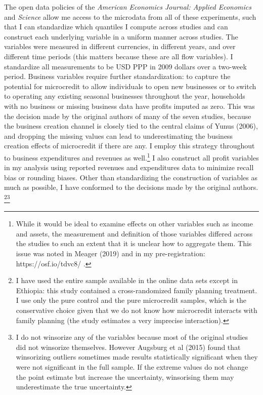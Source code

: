\documentclass[AER]{AEA}
\begin{document}

The open data policies of the \emph{American Economics Journal: Applied Economics} and \emph{Science} allow me access to the microdata from all of these experiments, such that I can standardize which quantiles I compute across studies and can construct each underlying variable in a uniform manner across studies. The variables were measured in different currencies, in different years, and over different time periods (this matters because these are all flow variables). I standardize all measurements to be USD PPP in 2009 dollars over a two-week period. Business variables require further standardization: to capture the potential for microcredit to allow individuals to open new businesses or to switch to operating any existing seasonal businesses throughout the year, households with no business or missing business data have profits imputed as zero. This was the decision made by the original authors of many of the seven studies, because the business creation channel is closely tied to the central claims of Yunus (2006), and dropping the missing values can lead to underestimating the business creation effects of microcredit if there are any. I employ this strategy throughout to business expenditures and revenues as well.\footnote{While it would be ideal to examine effects on other variables such as income and assets, the measurement and definition of those variables differed across the studies to such an extent that it is unclear how to aggregate them. This issue was noted in Meager (2019) and in my pre-registration: https://osf.io/tdvc8/ .} I also construct all profit variables in my analysis using reported revenues and expenditures data to minimize recall bias or rounding biases. Other than standardizing the construction of variables as much as possible, I have conformed to the decisions made by the original authors. \footnote{I have used the entire sample available in the online data sets except in Ethiopia: this study contained a cross-randomized family planning treatment. I use only the pure control and the pure microcredit samples, which is the conservative choice given that we do not know how microcredit interacts with family planning (the study estimates a very imprecise interaction).}\footnote{I do not winsorize any of the variables because most of the original studies did not winsorize themselves. However Augsburg et al (2015) found that winsorizing outliers sometimes made results statistically significant when they were not significant in the full sample. If the extreme values do not change the point estimate but increase the uncertainty, winsorising them may underestimate the true uncertainty.}
\end{document}
